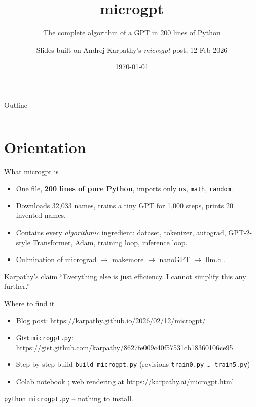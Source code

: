 \documentclass[aspectratio=169,11pt]{beamer}
\title{microgpt}
\subtitle{The complete algorithm of a GPT in 200 lines of Python}
\author{Slides built on Andrej Karpathy's \emph{microgpt} post, 12 Feb 2026}
\date{\today}
\begin{document}
\maketitle

\begin{frame}{Outline}
\small
\begin{columns}[t]
\tableofcontents[hideallsubsections,sections={1-6}]
\tableofcontents[hideallsubsections,sections={7-12}]
\end{columns}
\end{frame}

\section{Orientation}
\begin{frame}{What microgpt is}
\begin{itemize}
  \item One file, \textbf{200 lines of pure Python}, imports only \texttt{os}, \texttt{math}, \texttt{random}.
  \item Downloads 32{,}033 names, trains a tiny GPT for 1{,}000 steps, prints 20 invented names.
  \item Contains every \emph{algorithmic} ingredient: dataset, tokenizer, autograd, GPT-2-style Transformer, Adam, training loop, inference loop.
  \item Culmination of micrograd $\to$ makemore $\to$ nanoGPT $\to$ llm.c \parencite{karpathy2020micrograd,karpathy2022makemore,karpathy2022nanogpt,karpathy2024llmc}.
\end{itemize}
\begin{block}{Karpathy's claim}
``Everything else is just efficiency. I cannot simplify this any further.'' \parencite{karpathy2026microgpt}
\end{block}
\end{frame}

\begin{frame}{Where to find it}
\begin{itemize}
  \item Blog post: \url{https://karpathy.github.io/2026/02/12/microgpt/}
  \item Gist \texttt{microgpt.py}: \url{https://gist.github.com/karpathy/8627fe009c40f57531cb18360106ce95}
  \item Step-by-step build \texttt{build\_microgpt.py} (revisions \texttt{train0.py} \dots\ \texttt{train5.py}) \parencite{karpathy2026buildmicrogpt}
  \item Colab notebook \parencite{karpathy2026microgptcolab}; web rendering at \url{https://karpathy.ai/microgpt.html}
\end{itemize}
\vfill
\texttt{python microgpt.py} \quad -- nothing to install.
\end{frame}
\end{document}
